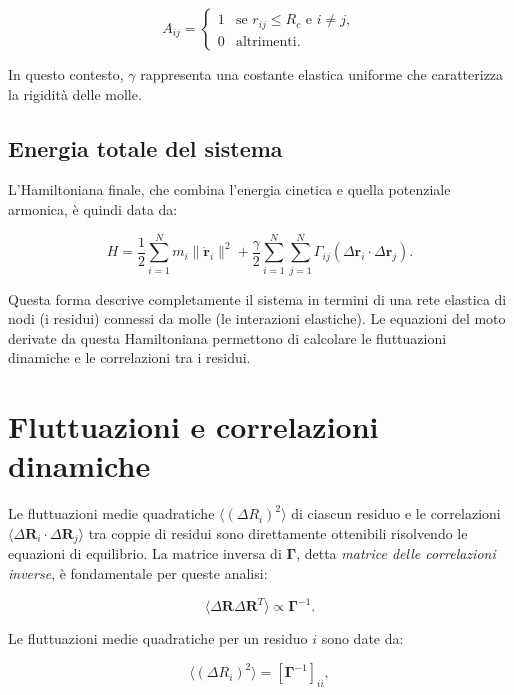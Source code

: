 \documentclass[Lau,binding=0.6cm,oneside,noexaminfo]{sapthesis}
\begin{document}
\begin{equation}
A_{ij} =
\begin{cases}
1 & \text{se } r_{ij} \leq R_c \text{ e } i \neq j, \\
0 & \text{altrimenti.}
\end{cases}
\end{equation}

In questo contesto, $\gamma$ rappresenta una costante elastica uniforme che caratterizza la rigidità delle molle.

\subsection*{Energia totale del sistema}
L'Hamiltoniana finale, che combina l'energia cinetica e quella potenziale armonica, è quindi data da:

\begin{equation}
H = \frac{1}{2} \sum_{i=1}^N m_i \|\dot{\mathbf{r}}_i\|^2 + \frac{\gamma}{2} \sum_{i=1}^N \sum_{j=1}^N \Gamma_{ij} (\Delta \mathbf{r}_i \cdot \Delta \mathbf{r}_j).
\end{equation}

Questa forma descrive completamente il sistema in termini di una rete elastica di nodi (i residui) connessi da molle (le interazioni elastiche). Le equazioni del moto derivate da questa Hamiltoniana permettono di calcolare le fluttuazioni dinamiche e le correlazioni tra i residui.

\section{Fluttuazioni e correlazioni dinamiche}
Le fluttuazioni medie quadratiche $\langle (\Delta R_i)^2 \rangle$ di ciascun residuo e le correlazioni $\langle \Delta \mathbf{R}_i \cdot \Delta \mathbf{R}_j \rangle$ tra coppie di residui sono direttamente ottenibili risolvendo le equazioni di equilibrio. La matrice inversa di $\mathbf{\Gamma}$, detta \textit{matrice delle correlazioni inverse}, è fondamentale per queste analisi:

\begin{equation}
\langle \Delta \mathbf{R} \Delta \mathbf{R}^T \rangle \propto \mathbf{\Gamma}^{-1}.
\end{equation}

Le fluttuazioni medie quadratiche per un residuo $i$ sono date da:

\begin{equation}
\langle (\Delta R_i)^2 \rangle = \left[ \mathbf{\Gamma}^{-1} \right]_{ii},
\end{equation}
\end{document}
